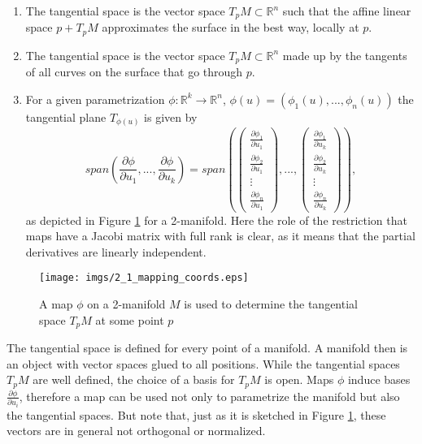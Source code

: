 \begin{enumerate}
	\item The tangential space is the vector space $T_pM\subset \mathbb R^n$ such that the affine linear space $p + T_p M$ approximates the surface in the best way, locally at $p$.
	\item The tangential space is the vector space $T_pM\subset \mathbb R^n$ made up by the tangents of all curves on the surface that go through $p$.
	\item For a given parametrization $\phi: \mathbb R^k \to \mathbb R^n$, $\phi(u) = (\phi_1(u),...,\phi_n(u))$ the tangential plane $T_{\phi(u)}$ is given by
			\[span(\frac{\partial \phi} {\partial u_1},..., \frac{\partial \phi} {\partial u_k}) = span(\begin{pmatrix}
	\frac{\partial \phi_1} {\partial u_1} \\
	\frac{\partial \phi_2} {\partial u_1}\\
	\vdots\\
	\frac{\partial \phi_n} {\partial u_1}
\end{pmatrix},...,\begin{pmatrix}
	\frac{\partial \phi_1} {\partial u_k} \\
	\frac{\partial \phi_2} {\partial u_k}\\
	\vdots\\
	\frac{\partial \phi_n} {\partial u_k}
\end{pmatrix}),\]
as depicted in Figure \ref{fig::2_1_mapping_coords} for a 2-manifold. Here the role of the restriction that maps have a Jacobi matrix with full rank is clear, as it means that the partial derivatives are linearly independent.
\end{enumerate}

\begin{figure}[tb]
\begin{center}
\texttt{[image: imgs/2\_1\_mapping\_coords.eps]}
\end{center}
\caption{A map $\phi$ on a 2-manifold $M$ is used to determine the tangential space $T_{p}M$ at some point $p$}
\label{fig::2_1_mapping_coords}
\end{figure}

The tangential space is defined for every point of a manifold. A manifold then is an object with vector spaces glued to all positions. While the tangential spaces $T_pM$  are well defined, the choice of a basis for $T_pM$ is open. Maps $\phi$ induce bases $\frac{\partial \phi}{\partial u_i}$, therefore a map can be used not only to parametrize the manifold but also the tangential spaces. But note that, just as it is sketched in Figure \ref{fig::2_1_mapping_coords}, these vectors are in general not orthogonal or normalized. 

